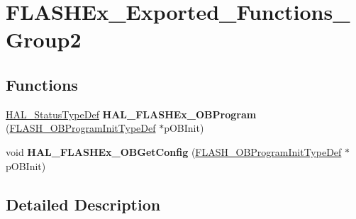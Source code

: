 \hypertarget{group___f_l_a_s_h_ex___exported___functions___group2}{\section{F\-L\-A\-S\-H\-Ex\-\_\-\-Exported\-\_\-\-Functions\-\_\-\-Group2}
\label{group___f_l_a_s_h_ex___exported___functions___group2}
}
\subsection*{Functions}
\begin{DoxyCompactItemize}
\item 
\hypertarget{group___f_l_a_s_h_ex___exported___functions___group2_ga001dd4a8defa9eb24a17c4df5953a41d}{\hyperlink{stm32l1xx__hal__def_8h_a63c0679d1cb8b8c684fbb0632743478f}{H\-A\-L\-\_\-\-Status\-Type\-Def} {\bfseries H\-A\-L\-\_\-\-F\-L\-A\-S\-H\-Ex\-\_\-\-O\-B\-Program} (\hyperlink{struct_f_l_a_s_h___o_b_program_init_type_def}{F\-L\-A\-S\-H\-\_\-\-O\-B\-Program\-Init\-Type\-Def} $\ast$p\-O\-B\-Init)}\label{group___f_l_a_s_h_ex___exported___functions___group2_ga001dd4a8defa9eb24a17c4df5953a41d}

\item 
\hypertarget{group___f_l_a_s_h_ex___exported___functions___group2_ga6d45d5442b8147533b1100ec40fe75d7}{void {\bfseries H\-A\-L\-\_\-\-F\-L\-A\-S\-H\-Ex\-\_\-\-O\-B\-Get\-Config} (\hyperlink{struct_f_l_a_s_h___o_b_program_init_type_def}{F\-L\-A\-S\-H\-\_\-\-O\-B\-Program\-Init\-Type\-Def} $\ast$p\-O\-B\-Init)}\label{group___f_l_a_s_h_ex___exported___functions___group2_ga6d45d5442b8147533b1100ec40fe75d7}

\end{DoxyCompactItemize}


\subsection{Detailed Description}
